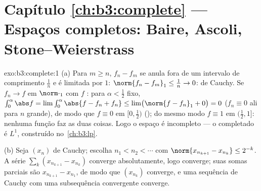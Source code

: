 \section*{Capítulo \ref{ch:b3:complete} --- Espaços completos:
Baire, Ascoli, Stone--Weierstrass}

\begin{solution}{exo:b3:complete:1}
(a) Para $m \geq n$, $f_n - f_m$ se anula fora de um intervalo de
comprimento $\frac1n$ e é limitada por $1$: $\norm{f_n - f_m}_1
\leq \frac1n \to 0$: de Cauchy. Se $f_n \to f$ em
$\norm\cdot_1$ com $f$ : para $\alpha <
\frac12$ fixo, $\int_0^{\alpha}\abs f = \lim \int_0^\alpha\abs{f -
f_n + f_n} \leq \lim\bigl(\norm{f - f_n}_1 + 0\bigr) = 0$
($f_n \equiv 0$ ali para $n$ grande), de modo que $f \equiv 0$ em
$[0, \frac12)$ (); do mesmo modo $f \equiv 1$ em
$(\frac12, 1]$: nenhuma função  faz as duas coisas. Logo o espaço
é incompleto --- o completado é $L^1$, construído no~\cref{ch:b3:lp}.

(b) Seja $(x_n)$ de Cauchy; escolha $n_1 < n_2 < \cdots$ com
$\norm{x_{n_{k+1}} - x_{n_k}} \leq 2^{-k}$. A série
$\sum_k (x_{n_{k+1}} - x_{n_k})$ converge absolutamente, logo
converge; suas somas parciais são $x_{n_{k+1}} - x_{n_1}$, de modo que
$(x_{n_k})$ converge, e uma sequência de Cauchy com uma subsequência
convergente converge.
\end{solution}


